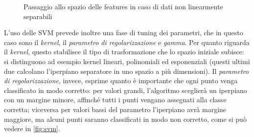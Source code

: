 \documentclass[oneside, openany]{book}
\begin{document}
		\begin{figure}[h]
		\centering
		 \quad
		 \quad
		 \quad
		 \quad
		\caption{Passaggio allo spazio delle features in caso di dati non linearmente separabili}
		\label{fig:hyp}
	\end{figure}	
	
	L'uso delle SVM prevede inoltre una fase di tuning dei parametri, che in questo caso sono il \textit{kernel}, il \textit{parametro di regolarizzazione} e \textit{gamma}. Per quanto riguarda il \textit{kernel}, questo stabilisce il tipo di trasformazione che lo spazio iniziale subisce: si distinguono ad esempio kernel lineari, polinomiali ed esponenziali (questi ultimi due calcolano l'iperpiano separatore in uno spazio a più dimensioni). Il \textit{parametro di regolarizzazione}, invece, esprime quanto è importante che ogni punto venga classificato in modo corretto: per valori grandi, l'algoritmo sceglierà un iperpiano con un margine minore, affinché tutti i punti vengano assegnati alla classe corretta; viceversa per valori bassi del parametro l'iperpiano avrà margine maggiore, ma alcuni punti saranno classificati in modo non corretto, come si può vedere in \ref{fig:svm}.
	
\end{document}

